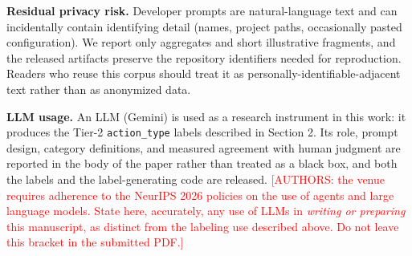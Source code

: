 \documentclass{article}
\begin{document}
\textbf{Residual privacy risk.} Developer prompts are natural-language text and
can incidentally contain identifying detail (names, project paths, occasionally
pasted configuration). We report only aggregates and short illustrative
fragments, and the released artifacts preserve the repository identifiers needed
for reproduction. Readers who reuse this corpus should treat it as
personally-identifiable-adjacent text rather than as anonymized data.

\textbf{LLM usage.} An LLM (Gemini) is used as a research instrument in this
work: it produces the Tier-2 \texttt{action\_type} labels described in Section 2.
Its role, prompt design, category definitions, and measured agreement with human
judgment are reported in the body of the paper rather than treated as a black
box, and both the labels and the label-generating code are released.
\textcolor{red}{[AUTHORS: the venue requires adherence to the NeurIPS 2026
policies on the use of agents and large language models. State here, accurately,
any use of LLMs in \emph{writing or preparing} this manuscript, as distinct from
the labeling use described above. Do not leave this bracket in the submitted
PDF.]}
\end{document}
